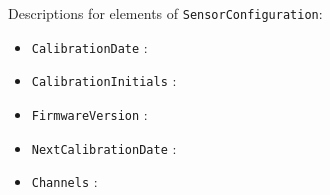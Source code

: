 Descriptions for elements of \texttt{SensorConfiguration}:

\begin{itemize}
\item \texttt{CalibrationDate} : 
\item \texttt{CalibrationInitials} : 
\item \texttt{FirmwareVersion} : 
\item \texttt{NextCalibrationDate} : 
\item \texttt{Channels} : 
\end{itemize}
\FloatBarrier
